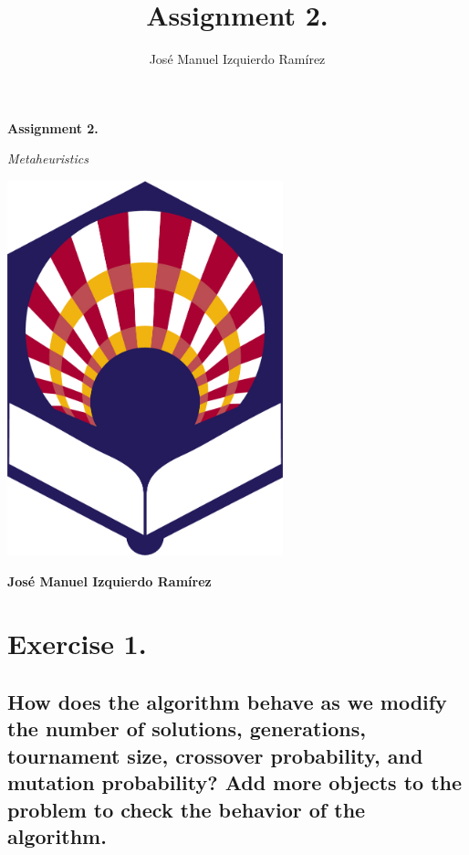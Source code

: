 \documentclass{article}
\title{Assignment 2.}
\author{José Manuel Izquierdo Ramírez}
\begin{document}
    \begin{titlepage}
        
        \centering
        {\LARGE\bfseries Assignment 2. \par}
        \vspace{0,5cm}
        {\itshape\Large Metaheuristics \par}
        \vspace{0,5cm}        
        \vspace{1cm}
        \includegraphics[width=0.6\textwidth]{../media/Logo_UCO.png}\par
        \vspace{3cm}
        {\LARGE\bfseries José Manuel Izquierdo Ramírez \par}


    \end{titlepage}
    
    \begin{index}
        \tableofcontents
        \newpage
        \listoffigures
    \end{index}

    \newpage
    
    \section{Exercise 1.}
    \subsection*{How does the algorithm behave as we modify the number of solutions, generations, tournament size, crossover probability, and mutation probability? Add more objects to the problem to check the behavior of the algorithm.}
\end{document}
